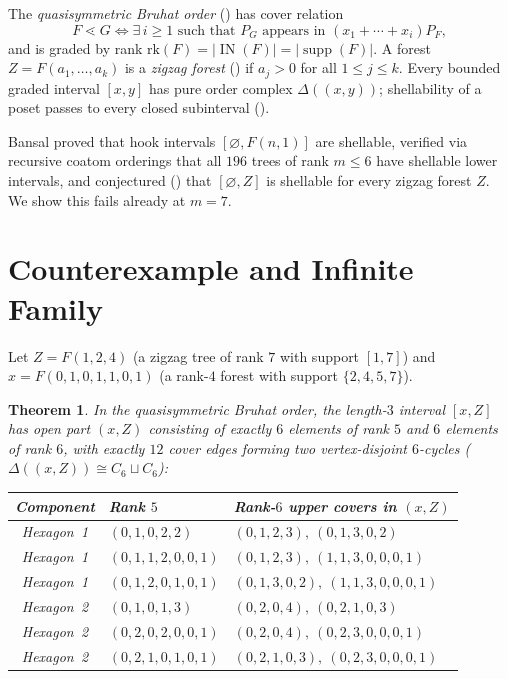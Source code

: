 \documentclass[11pt]{article}
\newtheorem{theorem}{Theorem}[section]
\theoremstyle{remark}
\DeclareMathOperator{\supp}{supp}
\DeclareMathOperator{\IN}{IN}
\begin{document}
The \emph{quasisymmetric Bruhat order} (\cite[Definition~2.7]{Bansal2026}) has cover relation
\[
F \lessdot G \iff \exists\, i \ge 1 \text{ such that } P_G \text{ appears in } (x_1 + \cdots + x_i) P_F,
\]
and is graded by rank $\mathrm{rk}(F) = |\IN(F)| = |\supp(F)|$. A forest $Z = F(a_1, \dots, a_k)$ is a \emph{zigzag forest} (\cite[Definition~6.8]{Bansal2026}) if $a_j > 0$ for all $1 \le j \le k$. Every bounded graded interval $[x, y]$ has pure order complex $\Delta((x, y))$; shellability of a poset passes to every closed subinterval (\cite[Fact~6.1]{Bansal2026}).

Bansal proved that hook intervals $[\varnothing, F(n, 1)]$ are shellable, verified via recursive coatom orderings that all $196$ trees of rank $m \le 6$ have shellable lower intervals, and conjectured (\cite[Conjecture~C and Conjecture~6.11]{Bansal2026}) that $[\varnothing, Z]$ is shellable for every zigzag forest $Z$. We show this fails already at $m = 7$.

\section{Counterexample and Infinite Family}

Let $Z = F(1, 2, 4)$ (a zigzag tree of rank $7$ with support $[1, 7]$) and $x = F(0, 1, 0, 1, 1, 0, 1)$ (a rank-$4$ forest with support $\{2, 4, 5, 7\}$).

\begin{theorem}\label{thm:cex}
In the quasisymmetric Bruhat order, the length-$3$ interval $[x, Z]$ has open part $(x, Z)$ consisting of exactly $6$ elements of rank $5$ and $6$ elements of rank $6$, with exactly $12$ cover edges forming two vertex-disjoint $6$-cycles ($\Delta((x, Z)) \cong C_6 \sqcup C_6$):
\begin{center}
\small
\begin{tabular}{cll}
\toprule
Component & Rank $5$ & Rank-$6$ upper covers in $(x, Z)$ \\
\midrule
Hexagon~1 & $(0,1,0,2,2)$ & $(0,1,2,3),\ (0,1,3,0,2)$ \\
Hexagon~1 & $(0,1,1,2,0,0,1)$ & $(0,1,2,3),\ (1,1,3,0,0,0,1)$ \\
Hexagon~1 & $(0,1,2,0,1,0,1)$ & $(0,1,3,0,2),\ (1,1,3,0,0,0,1)$ \\
\midrule
Hexagon~2 & $(0,1,0,1,3)$ & $(0,2,0,4),\ (0,2,1,0,3)$ \\
Hexagon~2 & $(0,2,0,2,0,0,1)$ & $(0,2,0,4),\ (0,2,3,0,0,0,1)$ \\
Hexagon~2 & $(0,2,1,0,1,0,1)$ & $(0,2,1,0,3),\ (0,2,3,0,0,0,1)$ \\
\bottomrule
\end{tabular}
\end{center}
\end{theorem}
\end{document}

